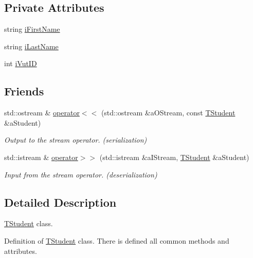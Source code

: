 \subsection*{Private Attributes}
\begin{DoxyCompactItemize}
\item 
string \hyperlink{class_c_value___t_student_1_1_t_student_ac0681545e968792ce0ce4226e2d0670d}{i\+First\+Name}
\item 
string \hyperlink{class_c_value___t_student_1_1_t_student_aac98cc79cfa4c6c523577991ebcc0c83}{i\+Last\+Name}
\item 
int \hyperlink{class_c_value___t_student_1_1_t_student_aaf7deea3a78dc217d85b4e23f677150f}{i\+Vut\+ID}
\end{DoxyCompactItemize}
\subsection*{Friends}
\begin{DoxyCompactItemize}
\item 
std\+::ostream \& \hyperlink{class_c_value___t_student_1_1_t_student_a434b280a875b2f3beb85d6969829df6a}{operator$<$$<$} (std\+::ostream \&a\+O\+Stream, const \hyperlink{class_c_value___t_student_1_1_t_student}{T\+Student} \&a\+Student)
\begin{DoxyCompactList}\small\item\em Output to the stream operator. ({\itshape serialization}) \end{DoxyCompactList}\item 
std\+::istream \& \hyperlink{class_c_value___t_student_1_1_t_student_a62b36b311265c60231321b86ca993137}{operator$>$$>$} (std\+::istream \&a\+I\+Stream, \hyperlink{class_c_value___t_student_1_1_t_student}{T\+Student} \&a\+Student)
\begin{DoxyCompactList}\small\item\em Input from the stream operator. ({\itshape deserialization}) \end{DoxyCompactList}\end{DoxyCompactItemize}


\subsection{Detailed Description}
\hyperlink{class_c_value___t_student_1_1_t_student}{T\+Student} class. 

Definition of \hyperlink{class_c_value___t_student_1_1_t_student}{T\+Student} class. There is defined all common methods and attributes. 

